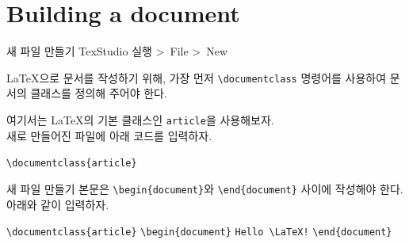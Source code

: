 \documentclass[12pt]{gshs_lecture}
\newenvironment{codeblock}[1]{
	\begin{block}{#1}
		\setstretch{1.0}
		\begin{small}
}{
		\end{small}
	\end{block}
}
\begin{document}
\section{Building a document}

\begin{frame}[t]{새 파일 만들기}
	TexStudio 실행 \textgreater\ File \textgreater\ New
	\vskip 1pc
	
	\LaTeX 으로 문서를 작성하기 위해, 가장 먼저 \texttt{\textbackslash documentclass} 명령어를 사용하여 문서의 클래스를 정의해 주어야 한다.
	
	\vskip 1pc
	
	여기서는 \LaTeX 의 기본 클래스인 \texttt{article}을 사용해보자. \\
	새로 만들어진 파일에 아래 코드를 입력하자.
	
	\vskip 1pc
	
	\begin{codeblock}{}
		\texttt{\textbackslash documentclass\{article\}}
	\end{codeblock}
	
\end{frame}

\begin{frame}[t]{새 파일 만들기}
	본문은 \texttt{\textbackslash begin\{document\}}와 \texttt{\textbackslash end\{document\}} 사이에 작성해야 한다.
	아래와 같이 입력하자.
	
	\vskip 1pc
	
	\begin{codeblock}{}
		\texttt{\textbackslash documentclass\{article\}}
		\vskip 1pc
		{\color{red}
		\texttt{\textbackslash begin\{document\}}
		\vskip 1pc
		\texttt{Hello \textbackslash LaTeX!}
		\vskip 1pc
		\texttt{\textbackslash end\{document\}}
		}
	\end{codeblock}
\end{frame}
\end{document}
